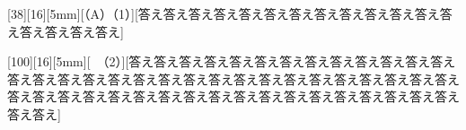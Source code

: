 \documentclass[8pt,b5paper,twoside]{ltjsreport}
\begin{document}
[38][16][5mm][（A）（1）][答え答え答え答え答え答え答え答え答え答え答え答え答え答え答え答え答え]

[100][16][5mm][　（2）][答え答え答え答え答え答え答え答え答え答え答え答え答え答え答え答え答え答え答え答え答え答え答え答え答え答え答え答え答え答え答え答え答え答え答え答え答え答え答え答え答え答え答え答え答え答え答え答え答え答え答え] %
\end{document}
